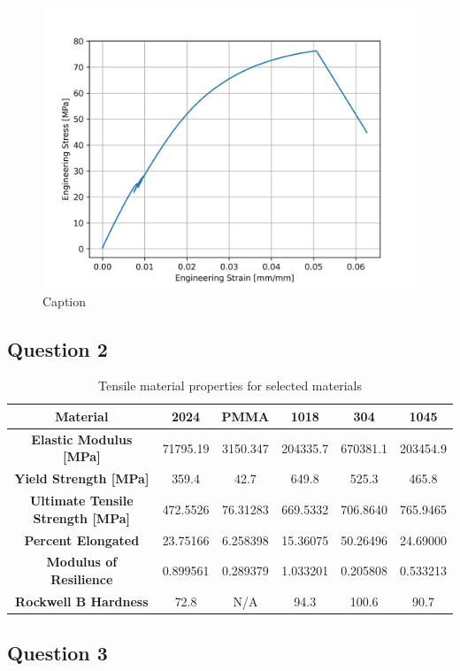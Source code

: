\documentclass{article}
\begin{document}
\begin{figure}[!h!]
    \centering
    \includegraphics[width=0.5\linewidth]{plots/q1_PMMA.png}
    \caption{Caption}
    \label{fig:q1pmma}
\end{figure}

\subsection{Question 2}

\begin{table}[!h!]
    \centering
    \def\arraystretch{1.5}
    \caption{Tensile material properties for selected materials}
    \begin{tabular}{|c|c|c|c|c|c|}
         \toprule
         \hline
         \textbf{Material}& \textbf{2024} & \textbf{PMMA} & \textbf{1018} & \textbf{304} & \textbf{1045} \\
         \midrule
         \hline
         \textbf{Elastic Modulus [MPa]} & 71795.19 & 3150.347 & 204335.7 & 670381.1 & 203454.9 \\
         \textbf{Yield Strength [MPa]} & 359.4 & 42.7 & 649.8 & 525.3 & 465.8 \\
         \textbf{Ultimate Tensile Strength [MPa]} & 472.5526 & 76.31283 & 669.5332 & 706.8640 & 765.9465 \\
         \textbf{Percent Elongated} & 23.75166 & 6.258398 & 15.36075 & 50.26496 & 24.69000 \\
         \textbf{Modulus of Resilience} & 0.899561 & 0.289379 & 1.033201 & 0.205808 & 0.533213\\
         \textbf{Rockwell B Hardness} & 72.8 & N/A & 94.3 & 100.6 & 90.7 \\
         \hline
    \end{tabular}
    \label{tab:q2}
\end{table}


\subsection{Question 3}
\newpage
\end{document}
